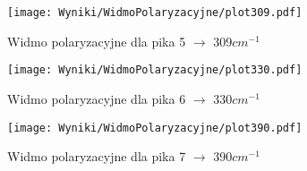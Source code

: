 \begin{figure}[H]
	\begin{center}
		\texttt{[image: Wyniki/WidmoPolaryzacyjne/plot309.pdf]}
		\caption{Widmo polaryzacyjne dla pika 5 $\rightarrow$ 309$cm^{-1}$ }
	\end{center}
\end{figure}

\begin{figure}[H]
	\begin{center}
		\texttt{[image: Wyniki/WidmoPolaryzacyjne/plot330.pdf]}
		\caption{Widmo polaryzacyjne dla pika 6 $\rightarrow$ 330$cm^{-1}$ }
	\end{center}
\end{figure}

\begin{figure}[H]
	\begin{center}
		\texttt{[image: Wyniki/WidmoPolaryzacyjne/plot390.pdf]}
		\caption{Widmo polaryzacyjne dla pika 7 $\rightarrow$ 390$cm^{-1}$ }
	\end{center}
\end{figure}


